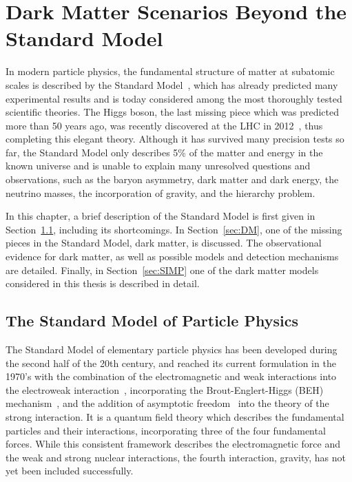\graphicspath{{chapt_dutch/}{intro/}{theory/}}

\renewcommand\evenpagerightmark{{\scshape\small Chapter 2}}
\renewcommand\oddpageleftmark{{\scshape\small Dark Matter Scenarios Beyond the Standard Model}}


\hyphenation{}

\chapter{Dark Matter Scenarios Beyond the Standard Model}
\label{ch:theory}

In modern particle physics, the fundamental structure of matter at subatomic scales is described by the Standard Model~\cite{Peskin:257493, BSMWiley}, which has already predicted many experimental results and is today considered among the most thoroughly tested scientific theories. The Higgs boson, the last missing piece which was predicted more than 50 years ago, was recently discovered at the \ac{LHC} in 2012~\cite{Aad:2012tfa, Chatrchyan:2012xdj}, thus completing this elegant theory. Although it has survived many precision tests so far, the Standard Model only describes 5\% of the matter and energy in the known universe and is unable to explain many unresolved questions and observations, such as the baryon asymmetry, dark matter and dark energy, the neutrino masses, the incorporation of gravity, and the hierarchy problem.

In this chapter, a brief description of the Standard Model is first given in Section~\ref{sec:SM}, including its shortcomings. In Section~\ref{sec:DM}, one of the missing pieces in the Standard Model, dark matter, is discussed. The observational evidence for dark matter, as well as possible models and detection mechanisms are detailed. Finally, in Section~\ref{sec:SIMP} one of the dark matter models considered in this thesis is described in detail.

\section{The Standard Model of Particle Physics}
\label{sec:SM}

The Standard Model of elementary particle physics has been developed during the second half of the 20th century, and reached its current formulation in the 1970's with the combination of the electromagnetic and weak interactions into the electroweak interaction~\cite{Glashow:1959wxa, Weinberg:1967tq, Salam:1959zz}, incorporating the Brout-Englert-Higgs (BEH) mechanism~\cite{Higgs:1964pj ,Englert:1964et, Guralnik:1964eu}, and the addition of asymptotic freedom~\cite{Gross:1973id, Politzer:1973fx} into the theory of the strong interaction.
It is a quantum field theory which describes the fundamental particles and their interactions, incorporating three of the four fundamental forces. While this consistent framework describes the electromagnetic force and the weak and strong nuclear interactions, the fourth interaction, gravity, has not yet been included successfully.

